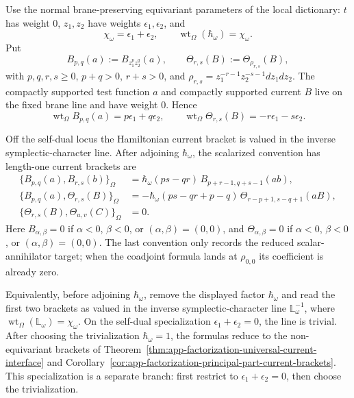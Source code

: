 \begin{thm}
\label{thm:app-omega-weighted-current-brackets}
  Use the normal brane-preserving equivariant parameters of the local
  dictionary:
  \(t\) has weight \(0\),
  \(z_1,z_2\) have weights \(\epsilon_1,\epsilon_2\), and
  \[
    \chi_\omega=\epsilon_1+\epsilon_2,\qquad
    \operatorname{wt}_\Omega(\hbar_\omega)=\chi_\omega .
  \]
  Put
  \[
    B_{p,q}(a):=B_{z_1^p z_2^q}(a),\qquad
    \Theta_{r,s}(B):=\Theta_{\rho_{r,s}}(B),
  \]
  with \(p,q,r,s\geq0\), \(p+q>0\), \(r+s>0\), and
  \(\rho_{r,s}=z_1^{-r-1}z_2^{-s-1}dz_1dz_2\).
  The compactly supported test function \(a\) and compactly supported
  current \(B\) live on the fixed brane line and have weight \(0\).  Hence
  \[
    \operatorname{wt}_\Omega B_{p,q}(a)=p\epsilon_1+q\epsilon_2,
    \qquad
    \operatorname{wt}_\Omega \Theta_{r,s}(B)
      =-r\epsilon_1-s\epsilon_2 .
  \]

  Off the self-dual locus the Hamiltonian current bracket is valued in the
  inverse symplectic-character line.  After adjoining \(\hbar_\omega\), the
  scalarized convention has
  length-one current brackets are
  \[
  \begin{aligned}
    \{B_{p,q}(a),B_{r,s}(b)\}_{\Omega}
      &=
      \hbar_\omega(ps-qr)\,
      B_{p+r-1,q+s-1}(ab),\\
    \{B_{p,q}(a),\Theta_{r,s}(B)\}_{\Omega}
      &=
      -\hbar_\omega(ps-qr+p-q)\,
      \Theta_{r-p+1,s-q+1}(aB),\\
    \{\Theta_{r,s}(B),\Theta_{u,v}(C)\}_{\Omega}
      &=0 .
  \end{aligned}
  \]
  Here \(B_{\alpha,\beta}=0\) if \(\alpha<0\), \(\beta<0\), or
  \((\alpha,\beta)=(0,0)\), and
  \(\Theta_{\alpha,\beta}=0\) if \(\alpha<0\), \(\beta<0\), or
  \((\alpha,\beta)=(0,0)\).  The last convention only records the reduced
  scalar-annihilator target; when the coadjoint formula lands at
  \(\rho_{0,0}\) its coefficient is already zero.

  Equivalently, before adjoining \(\hbar_\omega\), remove the displayed
  factor \(\hbar_\omega\) and read the first two brackets as valued in the
  inverse symplectic-character line
  \(\mathbb L_\omega^{-1}\), where
  \(\operatorname{wt}_\Omega(\mathbb L_\omega)=\chi_\omega\).
  On the self-dual specialization
  \(\epsilon_1+\epsilon_2=0\), the line is trivial.  After choosing the
  trivialization \(\hbar_\omega=1\), the formulas reduce to the
  non-equivariant brackets of
  Theorem~\ref{thm:app-factorization-universal-current-interface} and
  Corollary~\ref{cor:app-factorization-principal-part-current-brackets}.
  This specialization is a separate branch: first restrict to
  \(\epsilon_1+\epsilon_2=0\), then choose the trivialization.


\end{thm}
